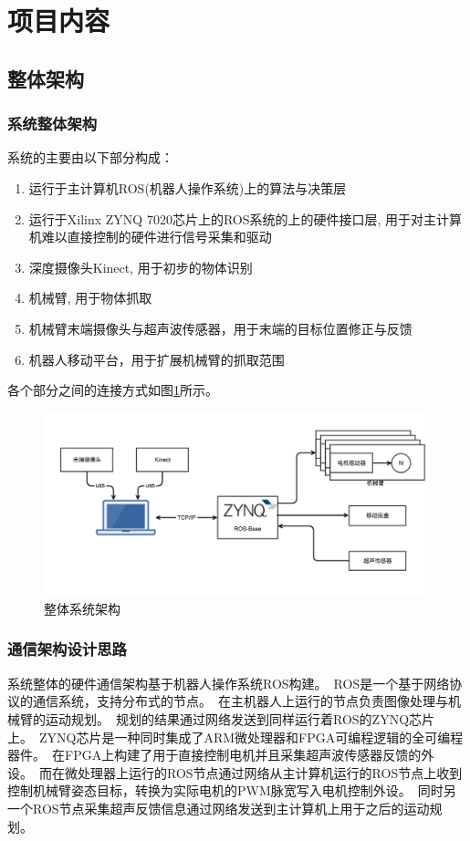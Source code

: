 \section{项目内容}

\subsection{整体架构}

\subsubsection{系统整体架构}
系统的主要由以下部分构成：
\begin{enumerate}
    \item 运行于主计算机ROS(机器人操作系统)上的算法与决策层
    \item 运行于Xilinx ZYNQ 7020芯片上的ROS系统的上的硬件接口层, 用于对主计算机难以直接控制的硬件进行信号采集和驱动
    \item 深度摄像头Kinect, 用于初步的物体识别
    \item 机械臂, 用于物体抓取
    \item 机械臂末端摄像头与超声波传感器，用于末端的目标位置修正与反馈
    \item 机器人移动平台，用于扩展机械臂的抓取范围
\end{enumerate}

各个部分之间的连接方式如图\ref{fig:structure}所示。\ 
\begin{figure}[ht]
    \includegraphics[width = \textwidth]{images/arch.png}
    \caption{整体系统架构}
    \label{fig:structure}
\end{figure}

\subsubsection{通信架构设计思路}
系统整体的硬件通信架构基于机器人操作系统ROS构建。\ ROS是一个基于网络协议的通信系统，支持分布式的节点。\ 
在主机器人上运行的节点负责图像处理与机械臂的运动规划。\ 规划的结果通过网络发送到同样运行着ROS的ZYNQ芯片上。\ 
ZYNQ芯片是一种同时集成了ARM微处理器和FPGA可编程逻辑的全可编程器件。\ 在FPGA上构建了用于直接控制电机并且采集超声波传感器反馈的外设。\ 
而在微处理器上运行的ROS节点通过网络从主计算机运行的ROS节点上收到控制机械臂姿态目标，转换为实际电机的PWM脉宽写入电机控制外设。\ 
同时另一个ROS节点采集超声反馈信息通过网络发送到主计算机上用于之后的运动规划。\ 

